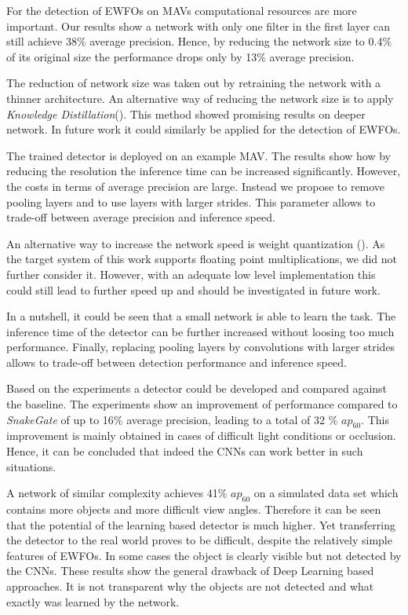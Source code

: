 \begin{enumerate}
	For the detection of \acp{EWFO} on \acp{MAV} computational resources are more important. Our results show a network with only one filter in the first layer can still achieve 38\% average precision. Hence, by reducing the network size to 0.4\% of its original size the performance drops only by 13\% average precision.
	
	The reduction of network size was taken out by retraining the network with a thinner architecture. An alternative way of reducing the network size is to apply \textit{Knowledge Distillation}(). This method showed promising results on deeper network. In future work it could similarly be applied for the detection of \acp{EWFO}.
	
	The trained detector is deployed on an example \ac{MAV}. The results show how by reducing the resolution the inference time can be increased significantly. However, the costs in terms of average precision are large. Instead we propose to remove pooling layers and to use layers with larger strides. This parameter allows to trade-off between average precision and inference speed.
	
	An alternative way to increase the network speed is weight quantization (). As the target system of this work supports floating point multiplications, we did not further consider it. However, with an adequate low level implementation this could still lead to further speed up and should be investigated in future work.
	
	In a nutshell, it could be seen that a small network is able to learn the task. The inference time of the detector can be further increased without loosing too much performance. Finally, replacing pooling layers by convolutions with larger strides allows to trade-off between detection performance and inference speed.
		
\end{enumerate}

Based on the experiments a detector could be developed and compared against the baseline. The experiments show an improvement of performance compared to \textit{SnakeGate} of up to 16\% average precision, leading to a total of 32 \% $ap_{60}$. This improvement is mainly obtained in cases of difficult light conditions or occlusion. Hence, it can be concluded that indeed the \acp{CNN} can work better in such situations.

A network of similar complexity achieves 41\% $ap_{60}$ on a simulated data set which contains more objects and more difficult view angles. Therefore it can be seen that the potential of the learning based detector is much higher. Yet transferring the detector to the real world proves to be difficult, despite the relatively simple features of \acp{EWFO}. In some cases the object is clearly visible but not detected by the \acp{CNN}. These results show the general drawback of Deep Learning based approaches. It is not transparent why the objects are not detected and what exactly was learned by the network.

